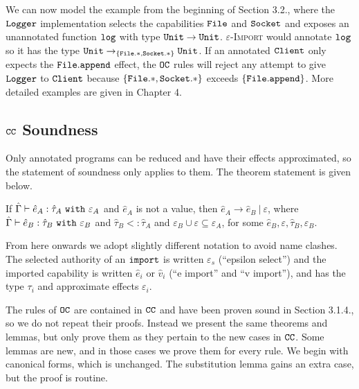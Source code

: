 We can now model the example from the beginning of Section 3.2., where the $\mathtt{Logger}$ implementation selects the capabilities $\mathtt{File}$ and $\mathtt{Socket}$ and exposes an unannotated function $\mathtt{log}$ with type $\mathtt{Unit} \rightarrow \mathtt{Unit}$. \textsc{$\varepsilon$-Import} would annotate $\mathtt{log}$ so it has the type $\mathtt{Unit} \rightarrow_{ \{ \mathtt{File.*, Socket.*} \} } \mathtt{Unit}$. If an annotated $\mathtt{Client}$ only expects the $\mathtt{File.append}$ effect, the $\mathtt{OC}$ rules will reject any attempt to give $\mathtt{Logger}$ to $\mathtt{Client}$ because $\mathtt{ \{ File.*, Socket.* \} }$ exceeds $ \mathtt{ \{File.append  \}}$. More detailed examples are given in Chapter 4.

\subsection{$\mathtt{CC}$ Soundness}

Only annotated programs can be reduced and have their effects approximated, so the statement of soundness only applies to them. The theorem statement is given below.

\begin{theorem}
If $\hat \Gamma \vdash \hat e_A: \hat \tau_A~\mathtt{with}~ \varepsilon_A$ and $\hat e_A$ is not a value, then $\hat e_A \longrightarrow \hat e_B~|~\varepsilon$, where $\hat \Gamma \vdash \hat e_B: \hat \tau_B~\mathtt{with}~ \varepsilon_B$ and $\hat \tau_B <: \hat \tau_A$ and $\varepsilon_B \cup \varepsilon \subseteq \varepsilon_A$, for some $\hat e_B, \varepsilon, \hat \tau_B, \varepsilon_B$.
\end{theorem}

From here onwards we adopt slightly different notation to avoid name clashes. The selected authority of an $\mathtt{import}$ is written $\varepsilon_{s}$ (``epsilon select'') and the imported capability is written $\hat e_i$ or $\hat v_i$ (``e import'' and ``v import''), and has the type $\tau_i$ and approximate effects $\varepsilon_i$.

The rules of $\mathtt{OC}$ are contained in $\mathtt{CC}$ and have been proven sound in Section 3.1.4., so we do not repeat their proofs. Instead we present the same theorems and lemmas, but only prove them as they pertain to the new cases in $\mathtt{CC}$. Some lemmas are new, and in those cases we prove them for every rule. We begin with canonical forms, which is unchanged. The substitution lemma gains an extra case, but the proof is routine.

